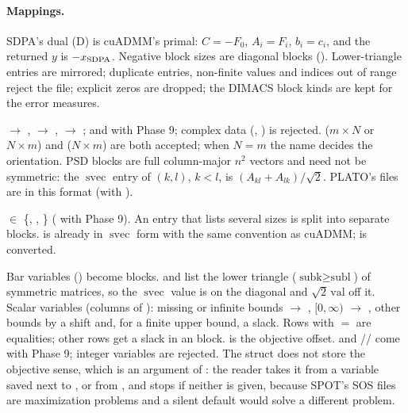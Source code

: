 \documentclass[11pt]{article}
\newcommand{\svec}{\operatorname{svec}}
\begin{document}
\paragraph{Mappings.}
\begin{description}[style=nextline,leftmargin=0.6cm]
\item[SDPA.] SDPA's dual (D) is cuADMM's primal: $C = -F_0$, $A_i = F_i$, $b_i = c_i$, and the returned $y$ is
$-x_{\rm SDPA}$. Negative block sizes are diagonal blocks (). Lower-triangle entries are mirrored;
duplicate entries, non-finite values and indices out of range reject the file; explicit zeros are dropped; the
DIMACS block kinds are kept for the error measures.
\item[SeDuMi.]  $\to$ ,  $\to$ ,  $\to$ ;  and  with
Phase 9; complex data (, ) is rejected.  ($m\times N$ or $N\times m$) and
 ($N\times m$) are both accepted; when $N = m$ the name decides the orientation. PSD blocks are full
column-major $n^2$ vectors and need not be symmetric: the $\svec$ entry of $(k,l)$, $k<l$, is $(A_{kl}+A_{lk})/\sqrt2$.
PLATO's  files are in this format (with ).
\item[SDPT3.]  $\in$ \{, , \} ( with Phase 9). An  entry that lists several
sizes is split into separate blocks.  is already in $\svec$ form with the same convention as cuADMM;
 is converted.
\item[MOSEK \code{prob}.] Bar variables () become  blocks.  and  list the lower
triangle ($\text{subk}\ge\text{subl}$) of symmetric matrices, so the $\svec$ value is  on the diagonal and
$\sqrt2\,\text{val}$ off it. Scalar variables (columns of ): missing or infinite bounds $\to$ ,
$[0,\infty)$ $\to$ , other bounds by a shift and, for a finite upper bound, a slack. Rows with
 $=$  are equalities; other rows get a slack in an  block.  is the objective
offset.  and // come with Phase 9; integer variables are rejected. The struct does
not store the objective sense, which is an argument of : the reader takes it from a variable
 saved next to , or from , and stops if neither is given, because SPOT's SOS files
are maximization problems and a silent default would solve a different problem.
\end{description}
\end{document}
